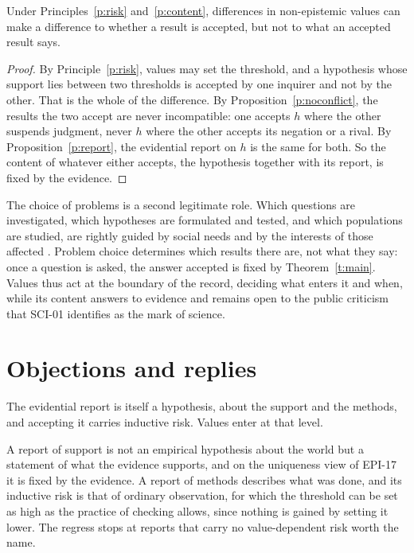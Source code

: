 \documentclass{situationist-preprint}
\begin{document}
\begin{theorem}\label{t:main}
Under Principles~\ref{p:risk} and~\ref{p:content}, differences in non-epistemic values can make a difference to whether a result is accepted, but not to what an accepted result says.
\end{theorem}

\begin{proof}
By Principle~\ref{p:risk}, values may set the threshold, and a hypothesis whose support lies between two thresholds is accepted by one inquirer and not by the other. That is the whole of the difference. By Proposition~\ref{p:noconflict}, the results the two accept are never incompatible: one accepts $h$ where the other suspends judgment, never $h$ where the other accepts its negation or a rival. By Proposition~\ref{p:report}, the evidential report on $h$ is the same for both. So the content of whatever either accepts, the hypothesis together with its report, is fixed by the evidence.
\end{proof}

The choice of problems is a second legitimate role. Which questions are investigated, which hypotheses are formulated and tested, and which populations are studied, are rightly guided by social needs and by the interests of those affected \citep{Kitcher2001}. Problem choice determines which results there are, not what they say: once a question is asked, the answer accepted is fixed by Theorem~\ref{t:main}. Values thus act at the boundary of the record, deciding what enters it and when, while its content answers to evidence and remains open to the public criticism that SCI-01 identifies as the mark of science.

\section{Objections and replies}

\begin{objection}
The evidential report is itself a hypothesis, about the support and the methods, and accepting it carries inductive risk. Values enter at that level.
\end{objection}

\begin{reply}
A report of support is not an empirical hypothesis about the world but a statement of what the evidence supports, and on the uniqueness view of EPI-17 it is fixed by the evidence. A report of methods describes what was done, and its inductive risk is that of ordinary observation, for which the threshold can be set as high as the practice of checking allows, since nothing is gained by setting it lower. The regress stops at reports that carry no value-dependent risk worth the name.
\end{reply}
\end{document}
